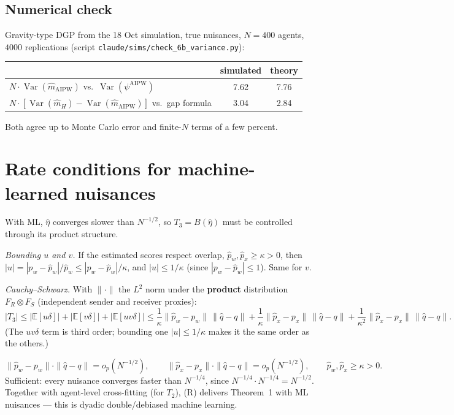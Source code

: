 \documentclass[11pt,a4paper]{article}
\theoremstyle{remark}
\newcommand{\E}{\mathbb{E}}
\newcommand{\Var}{\operatorname{Var}}
\newcommand{\1}{\mathbf{1}}
\begin{document}
\subsection*{Numerical check}
Gravity-type DGP from the 18 Oct simulation, true nuisances, $N=400$ agents, $4000$ replications (script \texttt{claude/sims/check\_6b\_variance.py}):
\begin{center}
\begin{tabular}{@{}lcc@{}}
\toprule
& simulated & theory \\
\midrule
$N\cdot\Var(\hat m_{\mathrm{AIPW}})$ vs.\ $\Var(\psi^{\mathrm{AIPW}})$ & 7.62 & 7.76\\
$N\cdot[\Var(\hat m_H)-\Var(\hat m_{\mathrm{AIPW}})]$ vs.\ gap formula & 3.04 & 2.84\\
\bottomrule
\end{tabular}
\end{center}
Both agree up to Monte Carlo error and finite-$N$ terms of a few percent.

\section{Rate conditions for machine-learned nuisances}

With ML, $\hat\eta$ converges slower than $N^{-1/2}$, so $T_3=B(\hat\eta)$ must be controlled through its product structure.

\emph{Bounding $u$ and $v$.} If the estimated scores respect overlap, $\hat p_w,\hat p_x\geq\kappa>0$, then
$|u|=|p_w-\hat p_w|/\hat p_w\le|p_w-\hat p_w|/\kappa$, and $|u|\le1/\kappa$ (since $|p_w-\hat p_w|\le1$). Same for $v$.

\emph{Cauchy--Schwarz.} With $\|\cdot\|$ the $L^2$ norm under the \textbf{product} distribution $F_R\otimes F_S$ (independent sender and receiver proxies):
\[
|T_3|\le |\E[u\delta]|+|\E[v\delta]|+|\E[uv\delta]|
\le \frac1\kappa\|\hat p_w-p_w\|\,\|\hat q-q\|+\frac1\kappa\|\hat p_x-p_x\|\,\|\hat q-q\|+\frac1{\kappa^2}\|\hat p_x-p_x\|\,\|\hat q-q\|.
\]
(The $uv\delta$ term is third order; bounding one $|u|\le1/\kappa$ makes it the same order as the others.)

\begin{resultbox}
\[
\|\hat p_w-p_w\|\cdot\|\hat q-q\|=o_p(N^{-1/2}),\qquad \|\hat p_x-p_x\|\cdot\|\hat q-q\|=o_p(N^{-1/2}),\qquad \hat p_w,\hat p_x\geq\kappa>0 .
\]
Sufficient: every nuisance converges faster than $N^{-1/4}$, since $N^{-1/4}\cdot N^{-1/4}=N^{-1/2}$. Together with agent-level cross-fitting (for $T_2$), (R) delivers Theorem~1 with ML nuisances --- this is dyadic double/debiased machine learning.
\end{resultbox}
\end{document}
